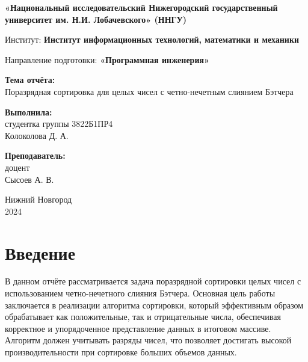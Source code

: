 \documentclass[12pt]{article}
\begin{document}
\begin{titlepage}
    \begin{center}
        \vspace*{1cm}

        \Large
        \textbf{«Национальный исследовательский  
        Нижегородский государственный университет им. Н.И. Лобачевского» (ННГУ)} 

        \vspace{1.5cm}

        \large
        Институт: \textbf{Институт информационных технологий, математики и механики}

        \vspace{0.5cm}

        Направление подготовки: \textbf{«Программная инженерия»}

        \vspace{1.5cm}

        \textbf{Тема отчёта:} \\ 
        {Поразрядная сортировка для целых чисел с четно-нечетным слиянием Бэтчера}

        \vspace{1.5cm}

        \textbf{Выполнила:} \\ 
        студентка группы 3822Б1ПР4 \\ 
        Колоколова Д. А. 

        \vspace{0.5cm}

        \textbf{Преподаватель:} \\ 
        доцент \\ 
        Сысоев А. В.

        \vfill

        \Large
        Нижний Новгород \\

        2024

    \end{center}
\end{titlepage}

\section{Введение}

В данном отчёте рассматривается задача поразрядной сортировки целых чисел с использованием четно-нечетного слияния Бэтчера. Основная цель работы заключается в реализации алгоритма сортировки, который эффективным образом обрабатывает как положительные, так и отрицательные числа, обеспечивая корректное и упорядоченное представление данных в итоговом массиве. Алгоритм должен учитывать разряды чисел, что позволяет достигать высокой производительности при сортировке больших объемов данных.
\end{document}
